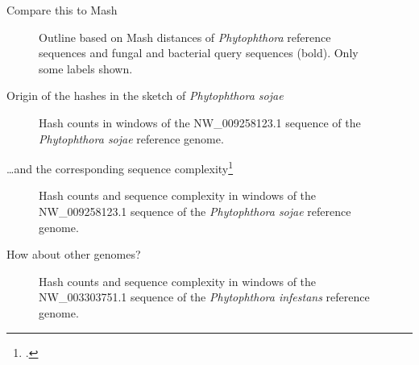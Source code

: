 \documentclass[aspectratio=169]{beamer}
\begin{document}
\begin{frame}{Compare this to Mash}
    \begin{figure}
        \fontsize{7}{10}\selectfont
        
        \caption{Outline based on Mash distances of \textit{Phytophthora}
        reference sequences and fungal and bacterial query sequences (bold).
        Only some labels shown.}
        \label{fig:outline}
    \end{figure}
\end{frame}

\begin{frame}{Origin of the hashes in the sketch of \textit{Phytophthora sojae}}
    \begin{figure}
        \fontsize{8}{10}\selectfont
        \centering
        
        \caption{Hash counts in windows of the NW\_009258123.1 sequence of the \textit{Phytophthora sojae} reference genome.}
        \label{fig:counts_psoj}
    \end{figure}
\end{frame}

\begin{frame}{\dots and the corresponding sequence complexity\footcite{pirogovHighcomplexityRegionsMammalian2019}}
    \begin{figure}
        \fontsize{8}{10}\selectfont
        \centering
        
        \caption{Hash counts and sequence complexity in windows of the
        NW\_009258123.1 sequence of the \textit{Phytophthora sojae} reference
        genome.}
        \label{fig:counts_psoj_comp}
    \end{figure}
\end{frame}

\begin{frame}{How about other genomes?}
    \begin{figure}
        \fontsize{8}{10}\selectfont
        \centering
        
        \caption{Hash counts and sequence complexity in windows of the
        NW\_003303751.1 sequence of the \textit{Phytophthora infestans}
        reference genome.}
        \label{fig:counts_pinf_comp}
    \end{figure}
\end{frame}
\end{document}
